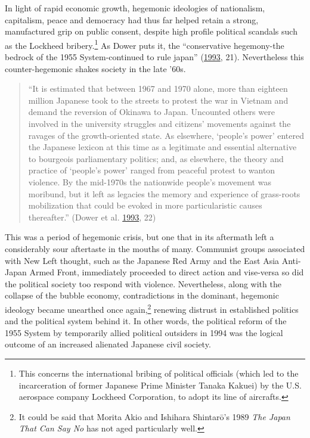 \documentclass[10pt,british,A4paper,twoside]{memoir}
\begin{document}
In light of rapid economic growth, hegemonic ideologies of nationalism,
capitalism, peace and democracy had thus far helped retain a strong,
manufactured grip on public consent, despite high profile political
scandals such as the Lockheed bribery.\footnote{This concerns the
  international bribing of political officials (which led to the
  incarceration of former Japanese Prime Minister Tanaka Kakuei) by the
  U.S. aerospace company Lockheed Corporation, to adopt its line of
  aircrafts.} As Dower puts it, the ``conservative hegemony-the bedrock
of the 1955 System-continued to rule japan''
(\protect\hyperlink{ref-dower_peace_1993}{1993}, 21). Nevertheless this
counter-hegemonic shakes society in the late '60s.

\begin{quote}
``It is estimated that between 1967 and 1970 alone, more than eighteen
million Japanese took to the streets to protest the war in Vietnam and
demand the reversion of Okinawa to Japan. Uncounted others were involved
in the university struggles and citizens' movements against the ravages
of the growth-oriented state. As elsewhere, `people's power' entered the
Japanese lexicon at this time as a legitimate and essential alternative
to bourgeois parliamentary politics; and, as elsewhere, the theory and
practice of `people's power' ranged from peaceful protest to wanton
violence. By the mid-1970s the nationwide people's movement was
moribund, but it left as legacies the memory and experience of
grass-roots mobilization that could be evoked in more particularistic
causes thereafter.'' (Dower et al.
\protect\hyperlink{ref-dower_peace_1993}{1993}, 22)
\end{quote}

This was a period of hegemonic crisis, but one that in its aftermath
left a considerably sour aftertaste in the mouths of many. Communist
groups associated with New Left thought, such as the Japanese Red Army
and the East Asia Anti-Japan Armed Front, immediately proceeded to
direct action and vise-versa so did the political society too respond
with violence. Nevertheless, along with the collapse of the bubble
economy, contradictions in the dominant, hegemonic ideology became
unearthed once again,\footnote{It could be said that Morita Akio and
  Ishihara Shintarō's 1989 \emph{The Japan That Can Say No} has not aged
  particularly well.} renewing distrust in established politics and the
political system behind it. In other words, the political reform of the
1955 System by temporarily allied political outsiders in 1994 was the
logical outcome of an increased alienated Japanese civil society.
\end{document}

